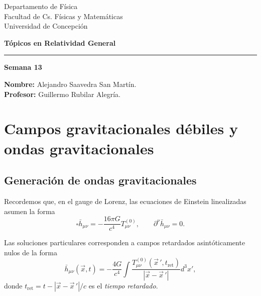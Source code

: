 \documentclass[letterpaper,11pt]{article}
\begin{document}
\pagestyle{plain}

\begin{flushleft}\vspace{-2cm}
Departamento de Física \\
Facultad de Cs. Físicas y Matemáticas\\
Universidad de Concepción
\end{flushleft}

\begin{flushright}\vspace{-1.5cm}
\textbf{Tópicos en Relatividad General} 
\end{flushright}



\rule{\linewidth}{0.1mm}

\begin{center}
\textbf{\LARGE Semana 13}
\end{center}

\begin{flushleft}
\textbf{Nombre:} Alejandro Saavedra San Martín. \\
\textbf{Profesor:} Guillermo Rubilar Alegría.
\end{flushleft}

\section{Campos gravitacionales débiles y ondas gravitacionales}

\subsection{Generación de ondas gravitacionales}

Recordemos que, en el gauge de Lorenz, las ecuaciones de Einstein linealizadas asumen la forma
\begin{equation}
\square \bar{h}_{\mu\nu} = - \frac{16\pi G}{c^4} T_{\mu\nu}^{(0)}, \qquad \partial^{\nu} \bar{h}_{\mu\nu} = 0.
\end{equation}

Las soluciones particulares corresponden a campos retardados asintóticamente nulos de la forma
\begin{equation}
\bar{h}_{\mu\nu}(\vec{x},t) = -  \frac{4G}{c^4} \int \frac{T_{\mu\nu}^{(0)}(\vec{x}\,', t_{\text{ret}})}{|\vec{x} - \vec{x}\,'|} d^3x', \label{eq:sol-GW}
\end{equation}
donde $t_{\text{ret}} =  t - |\vec{x} - \vec{x}\,'|/c$ es el \textit{tiempo retardado}.
\end{document}
